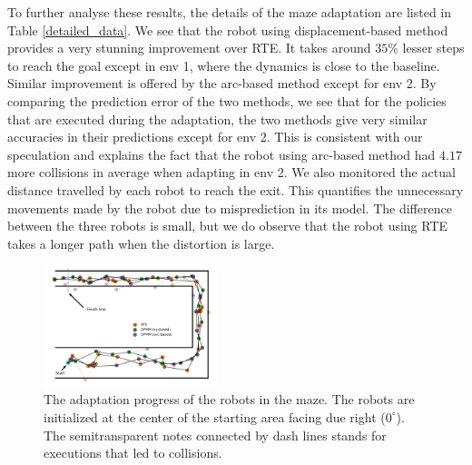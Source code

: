 To further analyse these results, the details of the maze adaptation are listed in Table \ref{detailed_data}.
We see that the robot using displacement-based method provides a very stunning improvement over RTE.
It takes around $35\%$ lesser steps to reach the goal except in env 1, where the dynamics is close to the baseline.
Similar improvement is offered by the arc-based method except for env 2.
By comparing the prediction error of the two methods, we see that for the policies that are executed during the adaptation, the two methods give very similar accuracies in their predictions except for env 2.
This is consistent with our speculation and explains the fact that the robot using arc-based method had $4.17$ more collisions in average when adapting in env 2.
We also monitored the actual distance travelled by each robot to reach the exit.
This quantifies the unnecessary movements made by the robot due to misprediction in its model.
The difference between the three robots is small, but we do observe that the robot using RTE takes a longer path when the distortion is large.

\begin{figure}[h]
\centering
\includegraphics[width=0.45\textwidth]{trajectories.pdf}
\caption{The adaptation progress of the robots in the maze.
The robots are initialized at the center of the starting area facing due right ($0^{\circ}$).
The semitransparent notes connected by dash lines stands for executions that led to collisions.
}
\label{navigation_process}
\end{figure}

